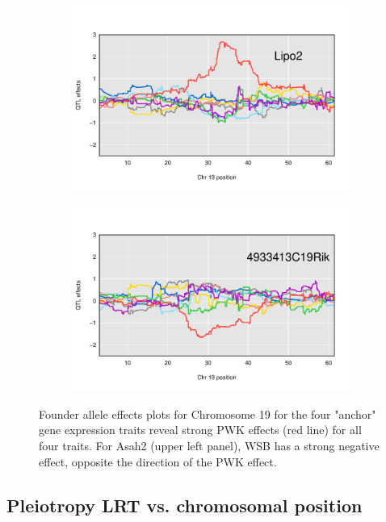 \documentclass{article}
\begin{document}
\begin{figure}
    \begin{subfigure}[t]{0.5\linewidth}
        \includegraphics[width = \linewidth]{../Rmd/allele_effects_Lipo2.pdf}
    \end{subfigure}
    \begin{subfigure}[t]{0.5\linewidth}
        \includegraphics[width = \linewidth]{../Rmd/allele_effects_4933413C19Rik.pdf}
    \end{subfigure}
        \caption{Founder allele effects plots for Chromosome 19 for the four "anchor" gene expression traits reveal strong PWK effects (red line) for all four traits. For Asah2 (upper left panel), WSB has a strong negative effect, opposite the direction of the PWK effect. }
\end{figure}




\subsection{Pleiotropy LRT vs. chromosomal position}
\end{document}
